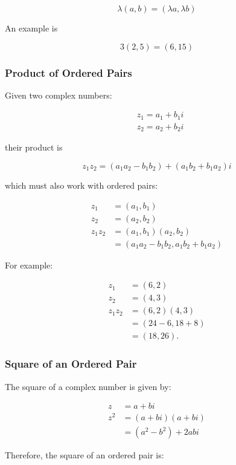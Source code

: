 \documentclass[10pt]{article}
\begin{document}
$$
\lambda(a, b)=(\lambda a, \lambda b)
$$

An example is

$$
3(2,5)=(6,15)
$$

\subsubsection{Product of Ordered Pairs}
Given two complex numbers:

$$
\begin{aligned}
& z_{1}=a_{1}+b_{1} i \\
& z_{2}=a_{2}+b_{2} i
\end{aligned}
$$

their product is

$$
z_{1} z_{2}=\left(a_{1} a_{2}-b_{1} b_{2}\right)+\left(a_{1} b_{2}+b_{1} a_{2}\right) i
$$

which must also work with ordered pairs:

$$
\begin{aligned}
z_{1} & =\left(a_{1}, b_{1}\right) \\
z_{2} & =\left(a_{2}, b_{2}\right) \\
z_{1} z_{2} & =\left(a_{1}, b_{1}\right)\left(a_{2}, b_{2}\right) \\
& =\left(a_{1} a_{2}-b_{1} b_{2}, a_{1} b_{2}+b_{1} a_{2}\right)
\end{aligned}
$$

For example:

$$
\begin{aligned}
z_{1} & =(6,2) \\
z_{2} & =(4,3) \\
z_{1} z_{2} & =(6,2)(4,3) \\
& =(24-6,18+8) \\
& =(18,26) .
\end{aligned}
$$

\subsubsection{Square of an Ordered Pair}
The square of a complex number is given by:

$$
\begin{aligned}
z & =a+b i \\
z^{2} & =(a+b i)(a+b i) \\
& =\left(a^{2}-b^{2}\right)+2 a b i
\end{aligned}
$$

Therefore, the square of an ordered pair is:
\end{document}
